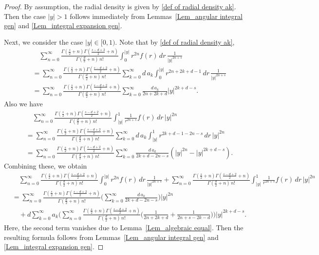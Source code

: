 \documentclass[10pt]{amsart}
\theoremstyle{plain}
\theoremstyle{remark}
\numberwithin{equation}{section}
\begin{document}
\begin{proof}
By assumption, the radial density is given by \eqref{def of radial density ak}. Then the case $|y|>1$ follows immediately from Lemmas~\ref{Lem_angular integral gen} and \ref{Lem_integral expansion gen}. 

Next, we consider the case $|y| \in [0,1).$
Note that  by \eqref{def of radial density ak}, 
\begin{align*}
&\quad \sum_{n=0}^\infty \frac{ \Gamma(\frac{s}{2}+n) \Gamma( \frac{s-d+2}{2}+n )  }{ \Gamma(\frac{d}{2}+n) \, n! } \int_0^{|y|}  r^{ 2n }  f(r)\,dr\, \frac{1}{|y|^{2n+s}} 
\\
&=  \sum_{n=0}^\infty  \frac{ \Gamma(\frac{s}{2}+n) \Gamma( \frac{s-d+2}{2}+n )  }{ \Gamma(\frac{d}{2}+n) \, n! }  \sum_{k=0}^\infty  d\, a_k \int_0^{|y|}  r^{ 2n+2k+d-1 }  \,dr\, \frac{1}{|y|^{2n+s}} 
\\
&= \sum_{n=0}^\infty  \frac{ \Gamma(\frac{s}{2}+n) \Gamma( \frac{s-d+2}{2}+n )  }{ \Gamma(\frac{d}{2}+n) \, n! }  \sum_{k=0}^\infty \frac{ d\, a_k }{2n+2k+d} |y|^{ 2k+d-s } . 
\end{align*}
Also we have 
\begin{align*}
&\quad \sum_{n=0}^\infty \frac{ \Gamma(\frac{s}{2}+n) \Gamma( \frac{s-d+2}{2}+n )  }{ \Gamma(\frac{d}{2}+n) \, n! }  \int_{|y|}^{1} \frac{1}{r^{2n+s}} f(r) \,dr \, |y|^{2n}
\\
&= \sum_{n=0}^\infty \frac{ \Gamma(\frac{s}{2}+n) \Gamma( \frac{s-d+2}{2}+n )  }{ \Gamma(\frac{d}{2}+n) \, n! } \sum_{k=0}^\infty d\,a_k \int_{|y|}^1 r^{2k+d-1-2n-s} \,dr \, |y|^{2n}
\\
&= \sum_{n=0}^\infty \frac{ \Gamma(\frac{s}{2}+n) \Gamma( \frac{s-d+2}{2}+n )  }{ \Gamma(\frac{d}{2}+n) \, n! } \sum_{k=0}^\infty \frac{d\,a_k}{ 2k+d-2n-s } ( |y|^{2n}-|y|^{2k+d-s} ). 
\end{align*}
Combining these, we obtain
\begin{align*}
&\quad \sum_{n=0}^\infty \frac{ \Gamma(\frac{s}{2}+n) \Gamma( \frac{s-d+2}{2}+n )  }{ \Gamma(\frac{d}{2}+n) \, n! } \int_0^{|y|}  r^{ 2n }  f(r)\,dr\, \frac{1}{|y|^{2n+s}}  + \sum_{n=0}^\infty \frac{ \Gamma(\frac{s}{2}+n) \Gamma( \frac{s-d+2}{2}+n )  }{ \Gamma(\frac{d}{2}+n) \, n! }  \int_{|y|}^{1} \frac{1}{r^{2n+s}} f(r) \,dr \, |y|^{2n}
\\
&=  \sum_{n=0}^\infty \frac{ \Gamma(\frac{s}{2}+n) \Gamma( \frac{s-d+2}{2}+n )  }{ \Gamma(\frac{d}{2}+n) \, n! } \bigg( \sum_{k=0}^\infty \frac{d\,a_k}{ 2k+d-2n-s } \bigg) |y|^{2n} 
\\
&\quad + d\sum_{k=0}^\infty a_k \bigg( \sum_{n=0}^\infty \frac{ \Gamma(\frac{s}{2}+n) \Gamma( \frac{s-d+2}{2}+n )  }{ \Gamma(\frac{d}{2}+n) \, n! } \Big( \frac{1}{2n+2k+d}+\frac{1}{ 2n+s-2k-d } \Big)  \bigg) |y|^{2k+d-s}. 
\end{align*} 
Here, the second term vanishes due to Lemma~\ref{Lem_algebraic equal}. 
Then the resulting formula follows from Lemmas~\ref{Lem_angular integral gen} and \ref{Lem_integral expansion gen}. 




\end{proof}
\end{document}
